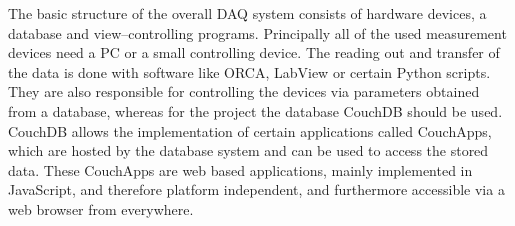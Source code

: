 The basic structure of the overall DAQ system consists of hardware devices, a database and view--controlling programs. Principally all of the used measurement devices need a PC or a small controlling device. The reading out and transfer of the data is done with software like ORCA, LabView or certain Python scripts. They are also responsible for controlling the devices via parameters obtained from a database, whereas for the project the database CouchDB should be used. CouchDB allows the implementation of certain applications called CouchApps, which are hosted by the database system and can be used to access the stored data. These CouchApps are web based applications, mainly implemented in JavaScript, and therefore platform independent, and furthermore accessible via a web browser from everywhere. 